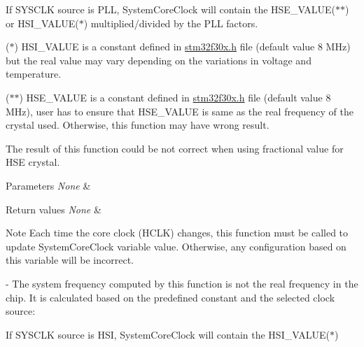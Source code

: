\begin{DoxyItemize}
\item If S\-Y\-S\-C\-L\-K source is P\-L\-L, System\-Core\-Clock will contain the H\-S\-E\-\_\-\-V\-A\-L\-U\-E($\ast$$\ast$) or H\-S\-I\-\_\-\-V\-A\-L\-U\-E($\ast$) multiplied/divided by the P\-L\-L factors.
\end{DoxyItemize}

($\ast$) H\-S\-I\-\_\-\-V\-A\-L\-U\-E is a constant defined in \hyperlink{stm32f30x_8h}{stm32f30x.\-h} file (default value 8 M\-Hz) but the real value may vary depending on the variations in voltage and temperature.

($\ast$$\ast$) H\-S\-E\-\_\-\-V\-A\-L\-U\-E is a constant defined in \hyperlink{stm32f30x_8h}{stm32f30x.\-h} file (default value 8 M\-Hz), user has to ensure that H\-S\-E\-\_\-\-V\-A\-L\-U\-E is same as the real frequency of the crystal used. Otherwise, this function may have wrong result.


\begin{DoxyItemize}
\item The result of this function could be not correct when using fractional value for H\-S\-E crystal.
\end{DoxyItemize}


\begin{DoxyParams}{Parameters}
{\em None} & \\
\hline
\end{DoxyParams}

\begin{DoxyRetVals}{Return values}
{\em None} & \\
\hline
\end{DoxyRetVals}
\begin{DoxyNote}{Note}
Each time the core clock (H\-C\-L\-K) changes, this function must be called to update System\-Core\-Clock variable value. Otherwise, any configuration based on this variable will be incorrect.

-\/ The system frequency computed by this function is not the real frequency in the chip. It is calculated based on the predefined constant and the selected clock source\-:
\end{DoxyNote}

\begin{DoxyItemize}
\item If S\-Y\-S\-C\-L\-K source is H\-S\-I, System\-Core\-Clock will contain the H\-S\-I\-\_\-\-V\-A\-L\-U\-E($\ast$)
\end{DoxyItemize}


